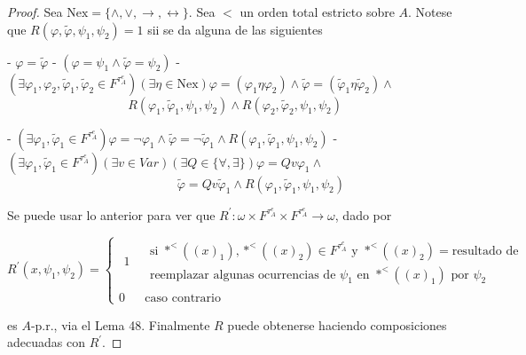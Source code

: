   \begin{proof}
    Sea \(\mathrm{Nex}=\{\wedge ,\vee ,\rightarrow ,\leftrightarrow \}\). Sea \(< \) un orden total estricto sobre \(A\). Notese que \(R(\varphi ,\tilde{\varphi} ,\psi _{1},\psi _{2})=1\) sii se da alguna de las siguientes

    - \(\varphi =\tilde{\varphi}\)
    - \((\varphi =\psi _{1}\wedge \tilde{\varphi}=\psi _{2})\)
    - \((\exists \varphi _{1},\varphi _{2},\tilde{\varphi}_{1},\tilde{ \varphi}_{2}\in F^{\tau _{A}^{e}})(\exists \eta \in \mathrm{Nex})\varphi =(\varphi _{1}\eta \varphi _{2})\wedge \tilde{\varphi}=(\tilde{\varphi} _{1}\eta \tilde{\varphi}_{2})\wedge \)
    \(\;\;\;\;\;\;\;\;\;\;\;\;\;\;\;\;\;\;\;\;\;\;\;\;\;\;\;\;\;\;\;\;\;\;\;R( \varphi _{1},\tilde{\varphi}_{1},\psi _{1},\psi _{2})\wedge R(\varphi _{2}, \tilde{\varphi}_{2},\psi _{1},\psi _{2})\)

    - \((\exists \varphi _{1},\tilde{\varphi}_{1}\in F^{\tau _{A}^{e}})\varphi =\lnot \varphi _{1}\wedge \tilde{\varphi}=\lnot \tilde{ \varphi}_{1}\wedge R(\varphi _{1},\tilde{\varphi}_{1},\psi _{1},\psi _{2})\)
    - \((\exists \varphi _{1},\tilde{\varphi}_{1}\in F^{\tau _{A}^{e}})(\exists v\in Var)(\exists Q\in \{\forall ,\exists \})\varphi =Qv\varphi _{1}\wedge \)
    \(\ \ \ \ \ \ \ \ \ \ \ \ \ \ \ \ \ \ \ \ \ \ \ \ \ \ \ \ \ \ \ \ \ \ \ \ \ \ \ \ \ \ \ \ \ \ \ \ \ \ \ \ \ \ \ \ \ \ \ \ \ \ \tilde{\varphi}=Qv\tilde{ \varphi}_{1}\wedge R(\varphi _{1},\tilde{\varphi}_{1},\psi _{1},\psi _{2})\)

    Se puede usar lo anterior para ver que \(R^{\prime }:\omega \times F^{\tau _{A}^{e}}\times F^{\tau _{A}^{e}}\rightarrow \omega \), dado por

    \(\displaystyle R^{\prime }(x,\psi _{1},\psi _{2})=\left\{ \begin{array}{cc} \begin{array}{c} 1 \\ \; \end{array} & \begin{array}{c} \text{si }\ast ^{< }((x)_{1}),\ast ^{< }((x)_{2})\in F^{\tau _{A}^{e}}\text{ y }\ast ^{< }((x)_{2})=\text{resultado de} \\ \text{reemplazar algunas ocurrencias de }\psi _{1}\text{ en }\ast ^{< }((x)_{1})\text{ por }\psi _{2} \end{array} \\ 0 & \text{caso contrario} \end{array} \right. \)

    es \(A\)-p.r., via el Lema 48. Finalmente \(R\) puede obtenerse haciendo composiciones adecuadas con \(R^{\prime }\).
  \end{proof}

